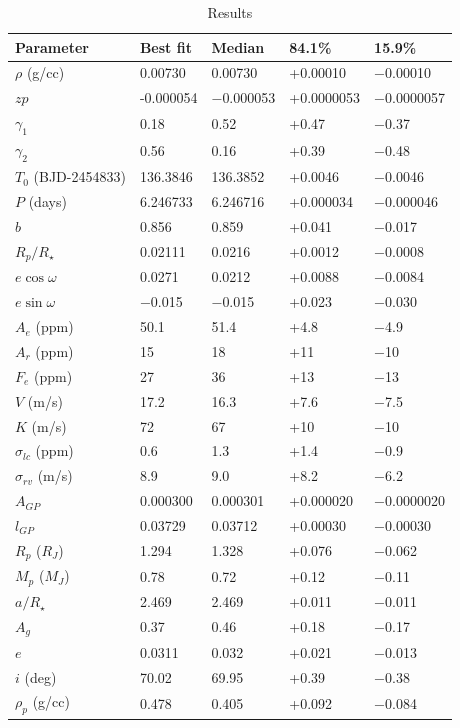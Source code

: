 \documentclass[apjl]{emulateapj}
\begin{document}
\begin{table}
\caption{Results}\label{tab:results}
\begin{tabular}{l l l l l}
Parameter&Best fit& Median&84.1\%&15.9\%\\
\hline
$\rho$ (g/cc)		&0.00730	& 0.00730&{+0.00010}&$-$0.00010\\
$zp$			&-0.000054	& $-$0.000053&{+0.0000053}&$-$0.0000057\\
$\gamma_1$	&0.18	& 0.52&{+0.47}&$-$0.37\\
$\gamma_2$	&0.56	& 0.16&{+0.39}&$-$0.48\\
$T_0$ (BJD-2454833)		&	136.3846& 136.3852&{+0.0046}&$-$0.0046 \\
$P$ 	(days)		&6.246733& 6.246716&{+0.000034}&$-$0.000046\\
$b$ 			&	0.856& 0.859&{+0.041}&$-$0.017\\
$R_{p}/R_{\star}$& 	0.02111& 0.0216&{+0.0012}&$-$0.0008 \\
$e\cos{\omega}$ &	0.0271& 0.0212&{+0.0088}&$-$0.0084\\
$e\sin{\omega}$ &	$-$0.015& $-$0.015&{+0.023}&$-$0.030\\
$A_e$ (ppm)		&	50.1& 51.4&{+4.8}&$-$4.9\\
$A_r$ (ppm)		&	15& 18&{+11}&$-$10\\
$F_e$ (ppm)		&	27& 36&{+13}&$-$13\\
$V$ 	(m/s)		&	17.2& 16.3&{+7.6}&$-$7.5\\
$K$ 	(m/s)		&72	& 67&{+10}&$-$10 \\
$\sigma_{lc}$ (ppm)	&0.6	& 1.3&{+1.4}&$-$0.9  \\
$\sigma_{rv}$ (m/s)	&	8.9& 9.0&{+8.2}&$-$6.2\\
$A_{GP}$ &0.000300& 0.000301 & {+0.000020}&$-$0.0000020 \\ 
$l_{GP}$  &0.03729& 0.03712&{+0.00030}&$-$0.00030 \\
\hline
$R_{p}$ ($R_{J}$) & 1.294 & 1.328 & +0.076 & $-$0.062 \\
$M_{p}$ ($M_{J}$) & 0.78 & 0.72 & +0.12 & $-$0.11 \\
$a/R_{\star}$ &2.469 & 2.469 & +0.011 & $-$0.011 \\
$A_g$ & 0.37 & 0.46 & +0.18 & $-$0.17 \\
$e$ & 0.0311 & 0.032 & +0.021 & $-$0.013 \\
$i$ (deg)& 70.02 &  69.95 & +0.39 & $-$0.38 \\
$\rho_{p}$ (g/cc) & 0.478 & 0.405 & +0.092 & $-$0.084\\
\hline
\end{tabular}
\end{table}
\end{document}
